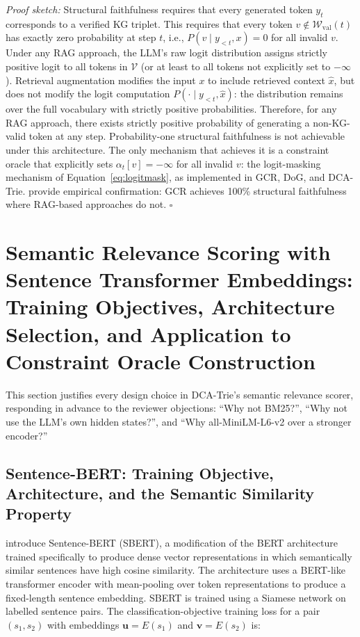 \textit{Proof sketch:} Structural faithfulness requires that every generated
token $y_t$ corresponds to a verified KG triplet. This requires that every
token $v \notin \mathcal{W}_{\text{val}}(t)$ has exactly zero probability at
step $t$, i.e., $P(v \mid y_{<t}, x) = 0$ for all invalid $v$. Under any RAG
approach, the LLM's raw logit distribution assigns strictly positive logit to
all tokens in $\mathcal{V}$ (or at least to all tokens not explicitly set to
$-\infty$). Retrieval augmentation modifies the input $x$ to include retrieved
context $\hat{x}$, but does not modify the logit computation
$P(\cdot \mid y_{<t}, \hat{x})$: the distribution remains over the full
vocabulary with strictly positive probabilities. Therefore, for any RAG approach,
there exists strictly positive probability of generating a non-KG-valid token at
any step. Probability-one structural faithfulness is not achievable under this
architecture. The only mechanism that achieves it is a constraint oracle that
explicitly sets $\alpha_t[v] = -\infty$ for all invalid $v$: the logit-masking
mechanism of Equation~\eqref{eq:logitmask}, as implemented in GCR, DoG, and
DCA-Trie. \citet{luo2024gcr} provide empirical confirmation: GCR achieves 100\%
structural faithfulness where RAG-based approaches do not. \hfill$\square$

\section{Semantic Relevance Scoring with Sentence Transformer Embeddings:
  Training Objectives, Architecture Selection, and Application to Constraint
  Oracle Construction}
\label{sec:sbert}

This section justifies every design choice in DCA-Trie's semantic relevance
scorer, responding in advance to the reviewer objections: ``Why not BM25?'',
``Why not use the LLM's own hidden states?'', and ``Why all-MiniLM-L6-v2 over a
stronger encoder?''

\subsection{Sentence-BERT: Training Objective, Architecture, and the Semantic
    Similarity Property}

\citet{reimers2019sentence} introduce Sentence-BERT (SBERT), a modification of
the BERT architecture trained specifically to produce dense vector representations
in which semantically similar sentences have high cosine similarity. The
architecture uses a BERT-like transformer encoder with mean-pooling over token
representations to produce a fixed-length sentence embedding. SBERT is trained
using a Siamese network on labelled sentence pairs. The classification-objective
training loss for a pair $(s_1, s_2)$ with embeddings $\mathbf{u} = E(s_1)$ and
$\mathbf{v} = E(s_2)$ is:

